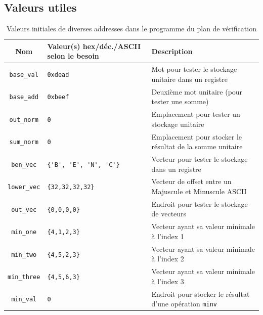 \documentclass[a11paper]{article}
\begin{document}
\begin{appendices}
\section{Valeurs utiles}

\begin{table}[H]
	\centering
	\footnotesize
	\caption{Valeurs initiales de diverses addresses dans le programme du plan de vérification}
	\label{tab:data}
	\begin{tabular}{@{}cp{5.5cm}l@{}}
		\toprule
    \textbf{Nom} &
    \textbf{Valeur(s)} hex/déc./ASCII selon le besoin &
    \textbf{Description} \\
		\midrule

    \verb|base_val|  & \verb|0xdead|               & Mot pour tester le stockage unitaire dans un registre        \\
    \verb|base_add|  & \verb|0xbeef|               & Deuxième mot unitaire (pour tester une somme)                \\
		\verb|out_norm|  & \verb|0|                    & Emplacement pour tester un stockage unitaire                 \\
		\verb|sum_norm|  & \verb|0|                    & Emplacement pour stocker le résultat de la somme unitaire    \\
		\verb|ben_vec|   & \verb|{'B', 'E', 'N', 'C'}| & Vecteur pour tester le stockage dans un registre             \\
		\verb|lower_vec| & \verb|{32,32,32,32}|        & Vecteur de offset entre un Majuscule et Minuscule ASCII      \\
		\verb|out_vec|   & \verb|{0,0,0,0}|            & Endroit pour tester le stockage de vecteurs                  \\
    \verb|min_one|   & \verb|{4,1,2,3}|            & Vecteur ayant sa valeur minimale à l'index 1 \\
    \verb|min_two|   & \verb|{4,5,2,3}|            & Vecteur ayant sa valeur minimale à l'index 2 \\
    \verb|min_three| & \verb|{4,5,6,3}|            & Vecteur ayant sa valeur minimale à l'index 3 \\
		\verb|min_val|   & \verb|0|                    & Endroit pour stocker le résultat d'une opération \verb|minv| \\

		\bottomrule
	\end{tabular}
\end{table}


\end{appendices}
\end{document}
